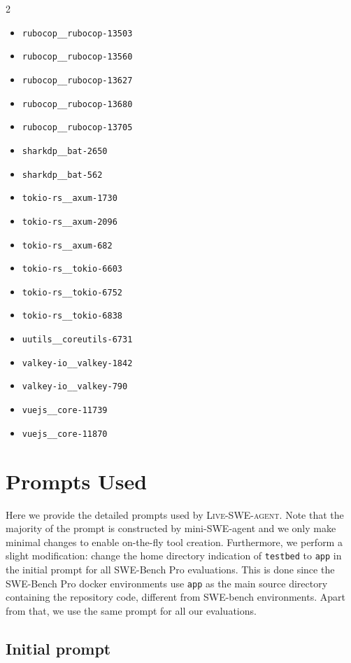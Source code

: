 \documentclass{article}
\newcommand{\tech}{\textsc{Live-SWE-agent}\xspace}
\newcommand{\minisweagent}{mini-SWE-agent\xspace}
\newcommand{\swebench}{SWE-bench\xspace}
\newcommand{\swebenchpro}{SWE-Bench Pro\xspace}
\newcommand{\CodeIn}[1]{{\small \texttt{#1}}}
\begin{document}
\begin{multicols}{2}
\begin{itemize}
\item \texttt{rubocop\_\_rubocop-13503}
\item \texttt{rubocop\_\_rubocop-13560}
\item \texttt{rubocop\_\_rubocop-13627}
\item \texttt{rubocop\_\_rubocop-13680}
\item \texttt{rubocop\_\_rubocop-13705}
\item \texttt{sharkdp\_\_bat-2650}
\item \texttt{sharkdp\_\_bat-562}
\item \texttt{tokio-rs\_\_axum-1730}
\item \texttt{tokio-rs\_\_axum-2096}
\item \texttt{tokio-rs\_\_axum-682}
\item \texttt{tokio-rs\_\_tokio-6603}
\item \texttt{tokio-rs\_\_tokio-6752}
\item \texttt{tokio-rs\_\_tokio-6838}
\item \texttt{uutils\_\_coreutils-6731}
\item \texttt{valkey-io\_\_valkey-1842}
\item \texttt{valkey-io\_\_valkey-790}
\item \texttt{vuejs\_\_core-11739}
\item \texttt{vuejs\_\_core-11870}
\end{itemize}
\end{multicols}


\section{Prompts Used}
\label{appendix:initial_prompt}

Here we provide the detailed prompts used by \tech. 
Note that the majority of the prompt is constructed by \minisweagent and we only make minimal changes to enable on-the-fly tool creation.
Furthermore, we perform a slight modification: change the home directory indication of \CodeIn{testbed} to \CodeIn{app} in the initial prompt for all \swebenchpro evaluations.
This is done since the \swebenchpro docker environments use \CodeIn{app} as the main source directory containing the repository code, different from \swebench environments.
Apart from that, we use the same prompt for all our evaluations.

\subsection{Initial prompt}
\end{document}
